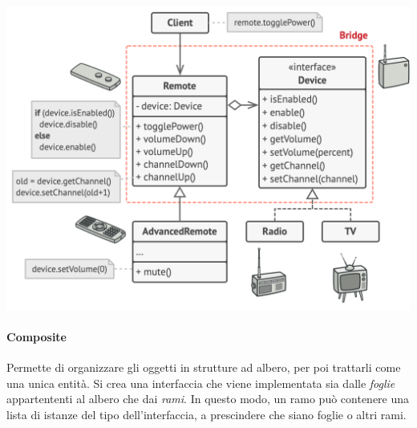 \documentclass{article}
\begin{document}
            \paragraph{}\includegraphics[scale=0.25]{./img/bridge.png}
                
            \paragraph{Composite} Permette di organizzare gli oggetti in strutture ad albero, per poi trattarli come una unica entità.
                Si crea una interfaccia che viene implementata sia dalle \textit{foglie} appartententi al albero che dai \textit{rami}.
                In questo modo, un ramo può contenere una lista di istanze del tipo dell'interfaccia, a prescindere che siano foglie o altri rami.             
\end{document}
